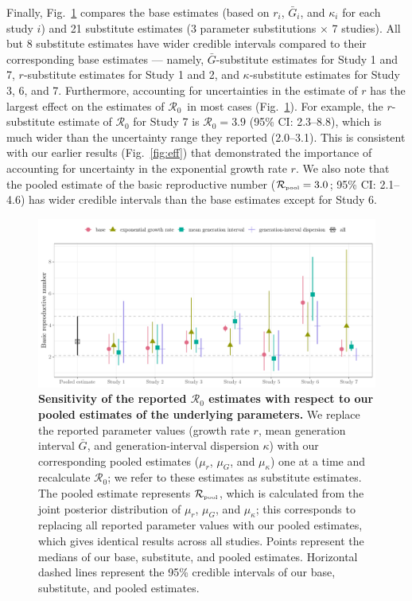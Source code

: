 \documentclass[12pt]{article}
\newcommand{\fref}[1]{Fig.~\ref{fig:#1}}
\newcommand{\Ro}{\ensuremath{{\mathcal R}_{0}}\xspace}
\newcommand{\Rpool}{\ensuremath{{\mathcal R}_{\textrm{\tiny{pool}}}}\xspace}
\begin{document}
Finally, \fref{R0} compares the base estimates (based on $r_i$, $\bar G_i$, and $\kappa_i$ for each study $i$) and 21 substitute estimates (3 parameter substitutions $\times$ 7 studies).
All but 8 substitute estimates have wider credible intervals compared to their corresponding base estimates --- namely, $\bar G$-substitute estimates for Study 1 and 7, $r$-substitute estimates for Study 1 and 2, and  $\kappa$-substitute estimates for Study 3, 6, and 7.
Furthermore, accounting for uncertainties in the estimate of $r$ has the largest effect on the estimates of \Ro\ in most cases (\fref{R0}).
For example, the $r$-substitute estimate of \Ro for Study 7 is $\Ro = 3.9$ (95\% CI: 2.3--8.8), which is much wider than the uncertainty range they reported (2.0--3.1).
This is consistent with our earlier results (\fref{eff}) that demonstrated the importance of accounting for uncertainty in the exponential growth rate $r$.
We also note that the pooled estimate of the basic reproductive number ($\Rpool = 3.0$; 95\% CI: 2.1--4.6) has wider credible intervals than the base estimates except for Study 6.

\begin{figure}[!th]
\includegraphics[width=\textwidth]{compare_R0.pdf}
\caption{
\textbf{Sensitivity of the reported \Ro estimates with respect to our pooled estimates of the underlying parameters.}
We replace the reported parameter values (growth rate $r$, mean generation interval $\bar G$, and generation-interval dispersion $\kappa$) with our corresponding pooled estimates ($\mu_r$, $\mu_G$, and $\mu_\kappa$) one at a time and recalculate \Ro; we refer to these estimates as substitute estimates.
The pooled estimate represents \Rpool, which is calculated from the joint posterior distribution of $\mu_r$, $\mu_G$, and $\mu_\kappa$;
this corresponds to replacing all reported parameter values with our pooled estimates, which gives identical results across all studies.
Points represent the medians of our base, substitute, and pooled estimates.
Horizontal dashed lines represent the 95\% credible intervals of our base, substitute, and pooled estimates.
}
\label{fig:R0}
\end{figure}
\end{document}
